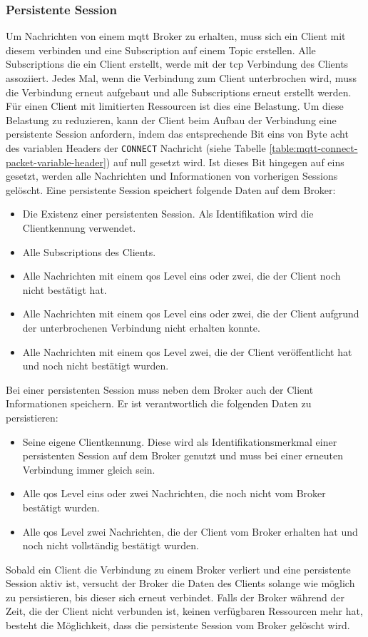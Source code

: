 \subsubsection{Persistente Session} \label{s:persistent-session}
Um Nachrichten von einem \ac{mqtt} Broker zu erhalten, muss sich ein Client mit diesem verbinden und eine Subscription auf einem Topic erstellen. Alle Subscriptions die ein Client erstellt, werde mit der \ac{tcp} Verbindung des Clients assoziiert.
Jedes Mal, wenn die Verbindung zum Client unterbrochen wird, muss die Verbindung erneut aufgebaut und alle Subscriptions erneut erstellt werden.
Für einen Client mit limitierten Ressourcen ist dies eine Belastung.
Um diese Belastung zu reduzieren, kann der Client beim Aufbau der Verbindung eine persistente Session anfordern, indem das entsprechende Bit eins von Byte acht des variablen Headers der \verb|CONNECT| Nachricht (siehe Tabelle \ref{table:mqtt-connect-packet-variable-header}) auf null gesetzt wird.
Ist dieses Bit hingegen auf eins gesetzt, werden alle Nachrichten und Informationen von vorherigen Sessions gelöscht.
Eine persistente Session speichert folgende Daten auf dem Broker:
\begin{itemize}
    \item Die Existenz einer persistenten Session. Als Identifikation wird die Clientkennung verwendet.
    \item Alle Subscriptions des Clients.
    \item Alle Nachrichten mit einem \ac{qos} Level eins oder zwei, die der Client noch nicht bestätigt hat.
    \item Alle Nachrichten mit einem \ac{qos} Level eins oder zwei, die der Client aufgrund der unterbrochenen Verbindung nicht erhalten konnte.
    \item Alle Nachrichten mit einem \ac{qos} Level zwei, die der Client veröffentlicht hat und noch nicht bestätigt wurden.
\end{itemize}
Bei einer persistenten Session muss neben dem Broker auch der Client Informationen speichern. Er ist verantwortlich die folgenden Daten zu persistieren:
\begin{itemize}
    \item Seine eigene Clientkennung. Diese wird als Identifikationsmerkmal einer persistenten Session auf dem Broker genutzt und muss bei einer erneuten Verbindung immer gleich sein.
    \item Alle \ac{qos} Level eins oder zwei Nachrichten, die noch nicht vom Broker bestätigt wurden.
    \item Alle \ac{qos} Level zwei Nachrichten, die der Client vom Broker erhalten hat und noch nicht vollständig bestätigt wurden.
\end{itemize}
Sobald ein Client die Verbindung zu einem Broker verliert und eine persistente Session aktiv ist, versucht der Broker die Daten des Clients solange wie möglich zu persistieren, bis dieser sich erneut verbindet. Falls der Broker während der Zeit, die der Client nicht verbunden ist, keinen verfügbaren Ressourcen mehr hat, besteht die Möglichkeit, dass die persistente Session vom Broker gelöscht wird.
\cite{teamPersistentSessionQueuing}

